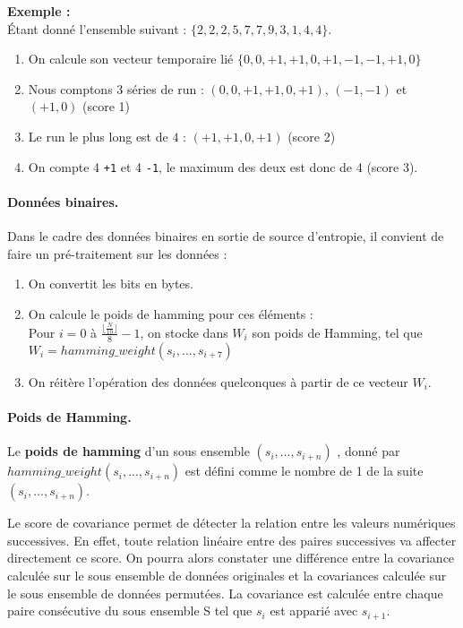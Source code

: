 \textbf{Exemple :} \\
Étant donné l'ensemble suivant : $\lbrace 2, 2, 2, 5, 7, 7, 9, 3, 1, 4, 4 \rbrace$. 
\begin{enumerate}
\item On calcule son vecteur temporaire lié $ \lbrace 0, 0, +1, +1, 0, +1, -1, -1, +1, 0 \rbrace $
\item Nous comptons 3 séries de run : $(0,0,+1,+1,0,+1)$, $(-1,-1)$ et $(+1,0)$ (score 1)
\item Le run le plus long est de $4$ : $(+1,+1,0,+1)$ (score 2)
\item On compte 4 \texttt{+1} et 4 \texttt{-1}, le maximum des deux est donc de 4 (score 3).
\end{enumerate}


\paragraph{Données binaires.\\}
Dans le cadre des données binaires en sortie de source d'entropie, il convient de faire un pré-traitement sur les données : 
\begin{enumerate}
\item On convertit les bits en bytes.
\item On calcule le poids de hamming pour ces éléments : \\
Pour $i=0$ à $\frac{\lfloor\frac{N}{10}\rfloor}{8} -1 $, on stocke dans $W_i$ son poids de Hamming, tel que $W_i=hamming\_weight(s_i,...,s_{i+7})$
\item On réitère l'opération des données quelconques à partir de ce vecteur $W_i$.
\end{enumerate}

\paragraph{Poids de Hamming.\\}
Le \textbf{poids de hamming} d'un sous ensemble $(s_i,...,s_{i+n})$ , donné par $hamming\_weight(s_i,...,s_{i+n})$ est défini comme le nombre de 1 de la suite $(s_i,...,s_{i+n})$.



Le score de covariance permet de détecter la relation entre les valeurs numériques successives. En effet, toute relation linéaire entre des paires successives va affecter directement ce score. On pourra alors constater une différence entre la covariance calculée sur le sous ensemble de données originales et la covariances calculée sur le sous ensemble de données permutées. La covariance est calculée entre chaque paire consécutive du sous ensemble S tel que $s_i$ est apparié avec $s_{i+1}$.\\

